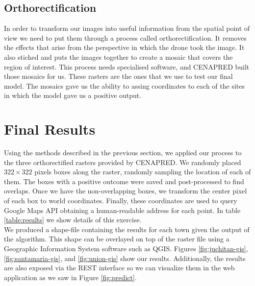 \subsection{Orthorectification}

In order to transform our images into useful information from the spatial point of view we need to put them through a process called orthorectification. It removes the effects that arise from the perspective in which the drone took the image. It also stiched and puts the images together to create a mosaic that covers the region of interest. This process needs specialised software, and CENAPRED built those mosaics for us. These rasters are the ones that we use to test our final model. The mosaics gave us the ability to assing coordinates to each of the sites in which the model gave us a positive output. 




\section{Final Results}

Using the methods described in the previous section, we applied our process to the three orthorectified rasters provided by CENAPRED. We randomly placed $322\times322$ pixels boxes along the raster, randomly sampling the location of each of them. The boxes with a positive outcome were saved and post-processed to find overlaps. Once we have the non-overlapping boxes, we transform the center pixel of each box to world coordinates. Finally, these coordinates are used to query Google Maps API obtaining a human-readable address for each point. In table \ref{table:results} we show details of this exercise.\\

We produced a shape-file containing the results for each town given the output of the algorithm. This shape can be overlayed on top of the raster file using a Geographic Information System software such as QGIS. Figures \ref{fig:juchitan-gis},\ref{fig:santamaria-gis}, and \ref{fig:union-gis} show our results. Additionally, the results are also exposed via the REST interface so we can visualize them in the web application as we saw in Figure \ref{fig:predict}.\\


